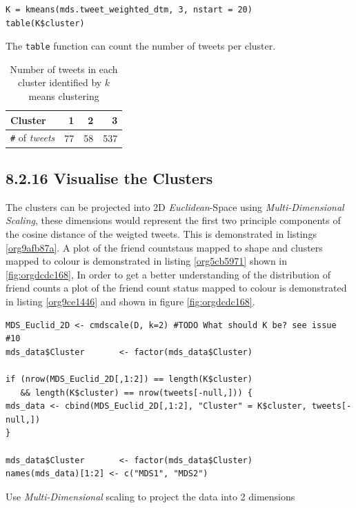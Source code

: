 \documentclass[11pt]{article}
\begin{document}
\begin{listing}[htbp]
\begin{verbatim}
K = kmeans(mds.tweet_weighted_dtm, 3, nstart = 20)
table(K$cluster)
\end{verbatim}
\caption{\label{orgb00eb95}The \texttt{table} function can count the number of tweets per cluster.}
\end{listing}

\begin{table}[htbp]
\caption{\label{tab:org3b93204}Number of tweets in each cluster identified by \(k\) means clustering}
\centering
\begin{tabular}{lrrr}
Cluster & 1 & 2 & 3\\
\hline
\texttt{\#} of \emph{tweets} & 77 & 58 & 537\\
\end{tabular}
\end{table}

\subsection{8.2.16 Visualise the Clusters}
\label{sec:org13127f3}
The clusters can be projected into 2D \emph{Euclidean}-Space using \emph{Multi-Dimensional
Scaling}, these dimensions would represent the first two principle components of
the cosine distance of the weigted tweets. This is demonstrated in listings
\ref{org9afb87a}. A plot of the friend countstaus mapped to shape and clusters mapped to
colour is demonstrated in listing \ref{org5cb5971} shown in \ref{fig:orgdcdc168}, In order to get a better
understanding of the distribution of friend counts a plot of the friend count
status mapped to colour is demonstrated in listing \ref{org9ce1446} and shown in figure \ref{fig:orgdcdc168}.


\begin{listing}[htbp]
\begin{verbatim}
MDS_Euclid_2D <- cmdscale(D, k=2) #TODO What should K be? see issue #10
mds_data$Cluster       <- factor(mds_data$Cluster)

if (nrow(MDS_Euclid_2D[,1:2]) == length(K$cluster)
   && length(K$cluster) == nrow(tweets[-null,])) {
mds_data <- cbind(MDS_Euclid_2D[,1:2], "Cluster" = K$cluster, tweets[-null,])
}

mds_data$Cluster       <- factor(mds_data$Cluster)
names(mds_data)[1:2] <- c("MDS1", "MDS2")
\end{verbatim}
\caption{\label{org9afb87a}Use \emph{Multi-Dimensional} scaling to project the data into 2 dimensions}
\end{listing}
\end{document}
